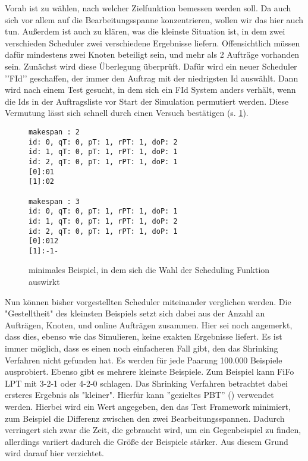 Vorab ist zu wählen, nach welcher Zielfunktion bemessen werden soll. Da auch \cite{Arn99} sich vor allem auf die Bearbeitungsspanne konzentrieren, wollen wir das hier auch tun. Außerdem ist auch zu klären, was die kleinste Situation ist, in dem zwei verschieden Scheduler zwei verschiedene Ergebnisse liefern. Offensichtlich müssen dafür mindestens zwei Knoten beteiligt sein, und mehr als 2 Aufträge vorhanden sein. Zunächst wird diese Überlegung überprüft. Dafür wird ein neuer Scheduler ’’FId’’ geschaffen, der immer den Auftrag mit der niedrigsten Id auswählt. Dann wird nach einem Test gesucht, in dem sich ein FId System anders verhält, wenn die Ids in der Auftragsliste vor Start der Simulation permutiert werden. Diese Vermutung lässt sich schnell durch einen Versuch bestätigen (s. \ref{minX}).\\
\begin{figure}
\centering
\begin{verbatim}
makespan : 2
id: 0, qT: 0, pT: 1, rPT: 1, doP: 2
id: 1, qT: 0, pT: 1, rPT: 1, doP: 1
id: 2, qT: 0, pT: 1, rPT: 1, doP: 1
[0]:01
[1]:02

makespan : 3
id: 0, qT: 0, pT: 1, rPT: 1, doP: 1
id: 1, qT: 0, pT: 1, rPT: 1, doP: 2
id: 2, qT: 0, pT: 1, rPT: 1, doP: 1
[0]:012
[1]:-1-
\end{verbatim}
\caption{minimales Beispiel, in dem sich die Wahl der Scheduling Funktion auswirkt}
\label{minX}
\end{figure}

Nun können bisher vorgestellten Scheduler miteinander verglichen werden. Die "Gestelltheit" des kleinsten Beispiels setzt sich dabei aus der Anzahl an Aufträgen, Knoten, und online Aufträgen zusammen. Hier sei noch angemerkt, dass dies, ebenso wie das Simulieren, keine exakten Ergebnisse liefert. Es ist immer möglich, dass es einen noch einfacheren Fall gibt, den das Shrinking Verfahren nicht gefunden hat. Es werden für jede Paarung 100.000 Beispiele ausprobiert. Ebenso gibt es mehrere kleinste Beispiele. Zum Beispiel kann FiFo LPT mit 
3-2-1 oder 4-2-0 schlagen. Das Shrinking Verfahren betrachtet dabei ersteres Ergebnis als "kleiner". Hierfür kann ''gezieltes PBT'' (\cite{testTarget}) verwendet werden. Hierbei wird ein Wert angegeben, den das Test Framework minimiert, zum Beispiel die Differenz zwischen den zwei Bearbeitungsspannen. Dadurch verringert sich zwar die Zeit, die gebraucht wird, um ein Gegenbeispiel zu finden, allerdings variiert dadurch die Größe der Beispiele stärker. Aus diesem Grund wird darauf hier verzichtet.\\


